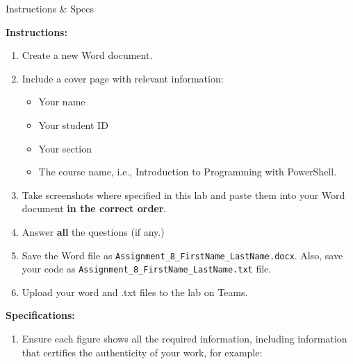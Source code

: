 \begin{step}{Instructions \& Specs}

    \textbf{Instructions:}

    \begin{enumerate}

        \item Create a new Word document. 

        \item Include a cover page with relevant information:

            \begin{itemize}
            
                \item Your name
                
                \item Your student ID
                
                \item Your section
                
                \item The course name, i.e., Introduction to Programming with PowerShell.
                
            \end{itemize}

        \item Take screenshots where specified in this lab and paste them into your Word document \textcolor{NordOrange}{\textbf{in the correct order}}. 

        \item Answer \textcolor{NordOrange}{\textbf{all}} the questions (if any.)

        \item Save the Word file as \textcolor{NordYellow}{\texttt{Assignment\_8\_FirstName\_LastName.docx}}. Also, save your code as \textcolor{NordYellow}{\texttt{Assignment\_8\_FirstName\_LastName.txt}} file.

        \item Upload your word and .txt files to the lab on Teams.
            
    \end{enumerate}

    \textbf{Specifications:}

    \begin{enumerate}

        \item Ensure each figure shows all the required information, including information that certifies the authenticity of your work, for example:


\end{enumerate}
\end{step}

